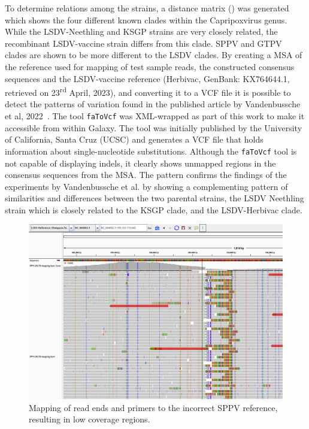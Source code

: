 To determine relations among the strains, a distance matrix () was generated which shows the four different known clades within the Capripoxvirus genus. While the \ac{LSDV}-Neethling and KSGP strains are very closely related, the recombinant \ac{LSDV}-vaccine strain differs from this clade. \ac{SPPV} and \ac{GTPV} clades are shown to be more different to the \ac{LSDV} clades. By creating a \ac{MSA} of the reference used for mapping of test sample reads, the constructed consensus sequences and the \ac{LSDV}-vaccine reference (Herbivac, GenBank: KX764644.1, retrieved on 23\textsuperscript{rd} April, 2023), and converting it to a \ac{VCF} file it is possible to detect the patterns of variation found in the published article by Vandenbussche et al, 2022~\cite{vandenbussche2022recombinant}. The tool \texttt{faToVcf} was XML-wrapped as part of this work to make it accessible from within Galaxy. The tool was initially published by the University of California, Santa Cruz (UCSC) and generates a \ac{VCF} file that holds information about single-nucleotide substitutions. Although the \texttt{faToVcf} tool is not capable of displaying indels, it clearly shows unmapped regions in the consensus sequences from the \ac{MSA}. The pattern confirms the findings of the experiments by Vandenbussche et al. by showing a complementing pattern of similarities and differences between the two parental strains, the \ac{LSDV} Neethling strain which is closely related to the KSGP clade, and the \ac{LSDV}-Herbivac clade.
\begin{figure}[ht!]
	\centering
	\includegraphics[width=1\textwidth]{media/4-capv-sppv-110.png}
	\caption[Mapping of read ends and primers to incorrect SPPV reference of LSDV reads.]{Mapping of read ends and primers to the incorrect SPPV reference, resulting in low coverage regions.}
	\label{fig:4-capv-sppv-110}
\end{figure}

